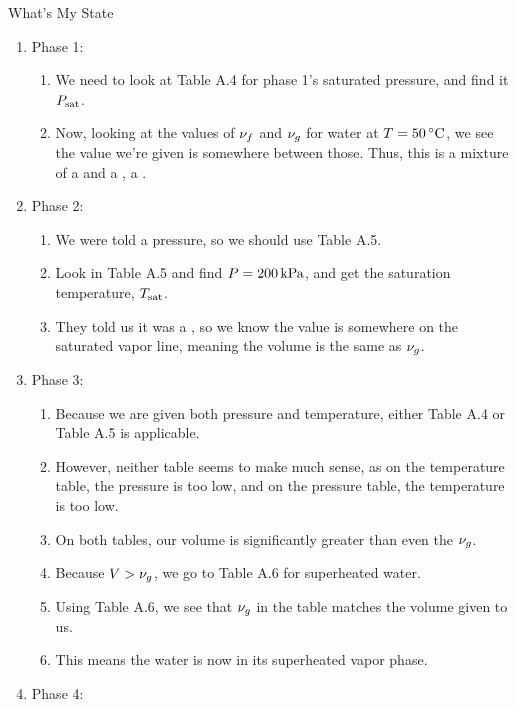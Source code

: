 \begin{example}[Problem 4.23]{What's My State}
  \begin{enumerate}[noitemsep]
  \item Phase 1:
    \begin{enumerate}[noitemsep]
    \item We need to look at Table A.4 for phase 1's saturated pressure, and find it $P_{\mathrm{sat}}$.
    \item Now, looking at the values of $\nu_{f}$ and $\nu_{g}$ for water at $\Temp = \SI{50}{\degreeCelsius}$, we see the value we're given is somewhere between those.
      Thus, this is a mixture of a  and a , a .
    \end{enumerate}
  \item Phase 2:
    \begin{enumerate}[noitemsep]
    \item We were told a pressure, so we should use Table A.5.
    \item Look in Table A.5 and find $P = \SI{200}{\kilo\pascal}$, and get the saturation temperature, $T_{\mathrm{sat}}$.
    \item They told us it was a , so we know the value is somewhere on the saturated vapor line, meaning the volume is the same as $\nu_{g}$.
    \end{enumerate}
  \item Phase 3:
    \begin{enumerate}[noitemsep]
    \item Because we are given both pressure and temperature, either Table A.4 or Table A.5 is applicable.
    \item However, neither table seems to make much sense, as on the temperature table, the pressure is too low, and on the pressure table, the temperature is too low.
    \item On both tables, our volume is significantly greater than even the $\nu_{g}$.
    \item Because $V > \nu_{g}$, we go to Table A.6 for superheated water.
    \item Using Table A.6, we see that $\nu_{g}$ in the table matches the volume given to us.
    \item This means the water is now in its superheated vapor phase.
    \end{enumerate}
  \item Phase 4:
    \begin{enumerate}[noitemsep]

\end{enumerate}
\end{enumerate}
\end{example}
